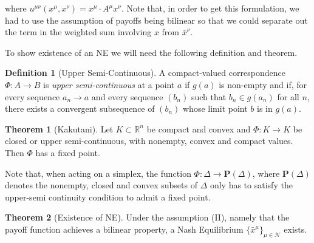 \documentclass{article}
\theoremstyle{definition}
\newtheorem*{definition}{Definition}
\newtheorem{theorem}{Theorem}
\newcommand{\agentset}{\mathcal{N}}
\newcommand{\xmu}{x^{\mu}}
\begin{document}
	where $u^{\mu \nu}(\xmu, x^\nu) = \xmu \cdot A^\mu x^\nu$. Note that, in order to get this
	formulation, we had to use the assumption of payoffs being bilinear so that we could separate
	out the term in the weighted sum involving $x$ from $\bar{x}^\nu$. 
	
	To show existence of an NE we will need the following definition and theorem.

	\begin{definition}[Upper Semi-Continuous]
		A compact-valued correspondence $\Phi: A \rightarrow B$ is \emph{upper semi-continuous} at a point $a$ if $g(a)$ is non-empty and if, for every sequence $a_n \rightarrow a$ and every sequence $(b_n)$ such that $b_n \in g(a_n)$ for all $n$, there exists a convergent subsequence of $(b_n)$ whose limit point $b$ is in $g(a)$.  
	\end{definition}

	\begin{theorem}[Kakutani]
		Let $K \subset \mathbb{R}^n$ be compact and convex and $\Phi: K \rightarrow K$ be closed or upper semi-continuous, with nonempty, convex and compact values. Then $\Phi$ has a fixed point.
	\end{theorem}

	Note that, when acting on a simplex, the function $\Phi: \Delta \rightarrow \textbf{P}(\Delta)$, where $\textbf{P}(\Delta)$ denotes the nonempty, closed and convex subsets of $\Delta$ only has to satisfy the upper-semi continuity condition to admit a fixed point.

	\begin{theorem}[Existence of NE]
		Under the assumption (II), namely that the payoff function achieves a bilinear property, a
		Nash Equilibrium $\{\bar{x}^\mu\}_{\mu \in \agentset}$ exists.
	\end{theorem}
\end{document}
